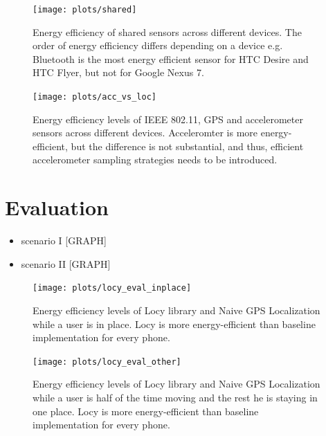 \documentclass[a2,landscape]{a0poster}
\begin{document}
\begin{figure}[H]
\texttt{[image: plots/shared]}
\caption{\label{p:shared} \footnotesize{Energy efficiency of shared sensors across different devices. The order of energy efficiency differs depending on a device e.g. Bluetooth is the most energy efficient sensor for HTC Desire and HTC Flyer, but not for Google Nexus 7.} }
\end{figure}

\begin{figure}[H]
\texttt{[image: plots/acc\_vs\_loc]}
\caption{\label{p:acc_vs_loc} \footnotesize{Energy efficiency levels of IEEE 802.11, GPS and accelerometer sensors across different devices. Acceleromter is more energy-efficient, but the difference is not substantial, and thus, efficient accelerometer sampling strategies needs to be introduced.} }
\end{figure}


\mbox{}\framebreak
\section*{Evaluation}
\begin{itemize}
   \item scenario I [GRAPH]
   \item scenario II [GRAPH]
  \end{itemize}
  
\begin{figure}[H]
\texttt{[image: plots/locy\_eval\_inplace]}
\caption{\label{p:locy_eval_place} \footnotesize{Energy efficiency levels of Locy library and Naive GPS Localization while a user is in place. Locy is more energy-efficient than baseline implementation for every phone.} }
\end{figure}


\begin{figure}[H]
\texttt{[image: plots/locy\_eval\_other]}
\caption{\label{p:locy_eval_other} \footnotesize{Energy efficiency levels of Locy library and Naive GPS Localization while a user is half of the time moving and the rest he is staying in one place. Locy is more energy-efficient than baseline implementation for every phone.} }
\end{figure}
\end{document}
